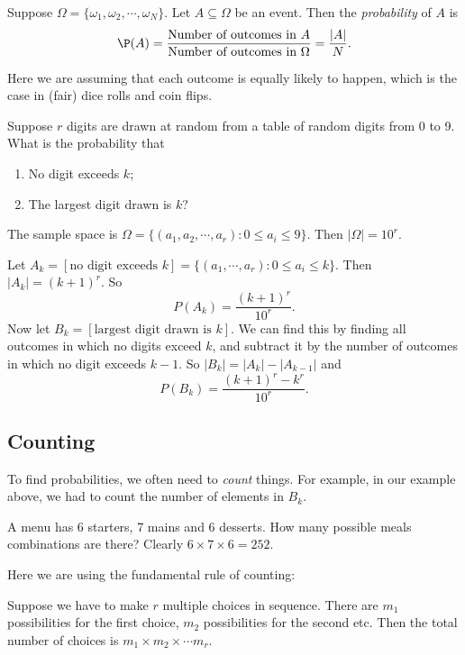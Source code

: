 \documentclass[a4paper]{article}
\begin{document}
\begin{defi}[Probability]
  Suppose $\Omega = \{\omega_1,\omega_2, \cdots, \omega_N\}$. Let $A\subseteq \Omega$ be an event. Then the \emph{probability} of $A$ is
  \[
    \P(A) = \frac{\text{Number of outcomes in } A}{\text{Number of outcomes in }\Omega} = \frac{|A|}{N}.
  \]
\end{defi}
Here we are assuming that each outcome is equally likely to happen, which is the case in (fair) dice rolls and coin flips.

\begin{eg}
  Suppose $r$ digits are drawn at random from a table of random digits from 0 to 9. What is the probability that
  \begin{enumerate}
    \item No digit exceeds $k$;
    \item The largest digit drawn is $k$?
  \end{enumerate}

  The sample space is $\Omega = \{(a_1, a_2, \cdots, a_r): 0 \leq a_i \leq 9\}$. Then $|\Omega| = 10^r$.

  Let $A_k = [\text{no digit exceeds }k] = \{(a_1, \cdots, a_r): 0 \leq a_i \leq k\}$. Then $|A_k| = (k + 1)^r$. So
  \[
    P(A_k) = \frac{(k + 1)^r}{10^r}.
  \]
  Now let $B_k = [\text{largest digit drawn is }k]$. We can find this by finding all outcomes in which no digits exceed $k$, and subtract it by the number of outcomes in which no digit exceeds $k - 1$. So $|B_k| = |A_k| - |A_{k - 1}|$ and
  \[
    P(B_k) = \frac{(k + 1)^r - k^r}{10^r}.
  \]
\end{eg}
\subsection{Counting}
To find probabilities, we often need to \emph{count} things. For example, in our example above, we had to count the number of elements in $B_k$.
\begin{eg}
  A menu has 6 starters, 7 mains and 6 desserts. How many possible meals combinations are there? Clearly $6 \times 7 \times 6 = 252$.
\end{eg}
Here we are using the fundamental rule of counting:
\begin{thm}
  Suppose we have to make $r$ multiple choices in sequence. There are $m_1$ possibilities for the first choice, $m_2$ possibilities for the second etc. Then the total number of choices is $m_1\times m_2\times \cdots m_r$.
\end{thm}
\end{document}
